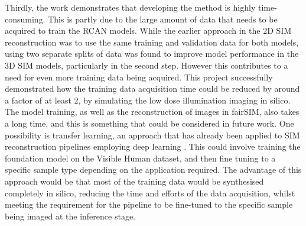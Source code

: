 \documentclass[12pt]{article}
\begin{document}
Thirdly, the work demonstrates that developing the method is highly time-consuming.
This is partly due to the large amount of data that needs to be acquired to train the RCAN models.
While the earlier approach in the 2D SIM reconstruction was to use the same training and validation data for both models,
using two separate splits of data was found to improve model performance in the 3D SIM models,
particularly in the second step.
However this contributes to a need for even more training data being acquired.
This project successfully demonstrated how the training data acquisition time could be reduced by around a factor of at least 2,
by simulating the low dose illumination imaging in silico.
The model training, as well as the reconstruction of images in fairSIM,
also takes a long time, and this is something that could be considered in future work.
One possibility is transfer learning, an approach that has already been applied to SIM reconstruction pipelines employing deep learning \cite{mlsim}.
This could involve training the foundation model on the Visible Human dataset,
and then fine tuning to a specific sample type depending on the application required.
The advantage of this approach would be that most of the training data would be synthesised completely in silico,
reducing the time and efforts of the data acquisition,
whilst meeting the requirement for the pipeline to be fine-tuned to the specific sample being imaged at the inference stage.
\end{document}
